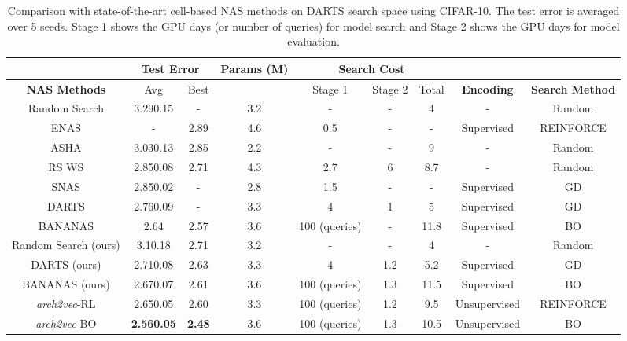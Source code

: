 \begin{table}[t] 
  \begin{adjustbox}{width=\columnwidth,center}
  \scriptsize{
  \begin{tabular}{|c|c|c|c|c|c|c|c|c|} 
  \hline
   &   \multicolumn{2}{c|}{\textbf{Test Error}} & \textbf{Params (M)} & \multicolumn{3}{c|}{\textbf{Search Cost}} &  \multicolumn{2}{c|}{}  \\ \hline
  \textbf{NAS Methods} &  Avg & Best &  & Stage 1 & Stage 2 & Total &  \textbf{Encoding} & \textbf{Search Method}           \\ \hline
  Random Search \cite{liu2018darts} & 3.290.15 & - & 3.2 & - & - & 4 & - & Random \\ 
  ENAS \cite{enas} & - & 2.89 & 4.6 & 0.5 & - & - & Supervised & REINFORCE \\ 
  ASHA \cite{Li2019RandomSA} & 3.030.13 & 2.85 & 2.2 & - & - & 9 & - & Random \\ 
  RS WS \cite{Li2019RandomSA} & 2.850.08 & 2.71 & 4.3 & 2.7 & 6 & 8.7 & - & Random \\  
  SNAS \cite{Xie2018SNAS} & 2.850.02 & - & 2.8 & 1.5 & - & - & Supervised & GD \\ 
  DARTS \cite{liu2018darts} & 2.760.09 & - & 3.3 & 4 & 1 & 5 & Supervised & GD \\ 
  BANANAS \cite{white2019bananas} & 2.64 & 2.57 & 3.6 & 100 (queries) & - & 11.8 & Supervised & BO \\ \hline 
  Random Search (ours) & 3.10.18 & 2.71 & 3.2 & - & - & 4 & - & Random  \\ 
  DARTS (ours) & 2.710.08 & 2.63 & 3.3 & 4 & 1.2 & 5.2 & Supervised & GD  \\ 
  BANANAS (ours) & 2.670.07 & 2.61 & 3.6 & 100 (queries) & 1.3 & 11.5 & Supervised & BO \\ \hline
  \textit{arch2vec}-RL & 2.650.05 & 2.60 & 3.3 & 100 (queries) & 1.2 & 9.5 &  Unsupervised & REINFORCE \\ 
  \textit{arch2vec}-BO & \textbf{2.560.05} & \textbf{2.48} & 3.6 & 100 (queries) & 1.3 & 10.5 & Unsupervised & BO \\ \hline  
  \end{tabular} 
  }
  \end{adjustbox}
  \vspace{0.5mm}
  \caption{Comparison with state-of-the-art cell-based NAS methods on DARTS search space using CIFAR-10. The test error is averaged over 5 seeds. Stage 1 shows the GPU days (or number of queries) for model search and Stage 2 shows the GPU days for model evaluation.}
  \vspace{-2mm}
  \label{table:darts}
  \end{table} 


  





